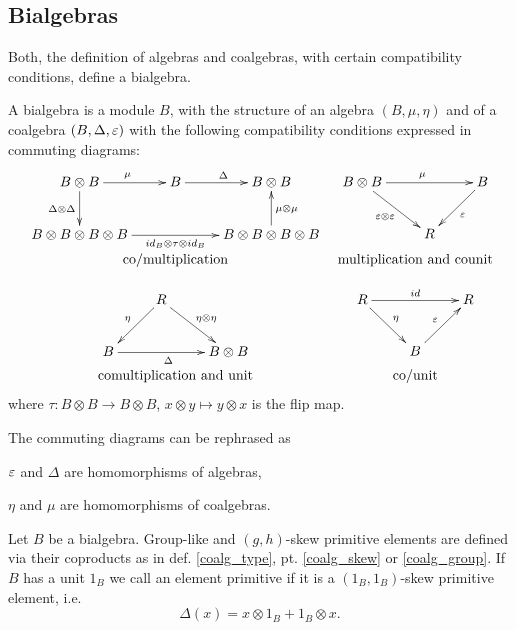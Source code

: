 \subsection{Bialgebras}
Both, the definition of algebras and coalgebras, with certain compatibility conditions, define a bialgebra.
\begin{defi}\label{defi11}
A bialgebra is a module $B$, with the structure of an algebra $(B,\mu,\eta)$ and of a coalgebra $(B,\Delta,\varepsilon)$ with the following compatibility conditions expressed in commuting diagrams:
$$\bao{cc}
\xymatrix{
 B \otimes B \ar[r]^\mu \ar[d]_{\Delta \otimes \Delta} & B \ar[r]^\Delta & B \otimes B\\
 B \otimes B \otimes B \otimes B \ar[rr]_{id_B \otimes \tau \otimes id_B}&& B \otimes B \otimes B \otimes B \ar[u]_{\mu \otimes \mu}\\
 }
 &\xymatrix{
 B \otimes B \ar[rd]_{\eps \otimes \eps} \ar[rr]^\mu & & B\ar[ld]^\eps\\
 &R&
 }\\
 \trm{co/multiplication} & \trm{multiplication~and~counit}\\
 &\\
 \xymatrix{
 &R \ar[ld]_\eta \ar[rd]^{\eta \otimes \eta}&\\
  B \ar[rr]_\Delta&&B \otimes B \\ 
 }
 &\xymatrix{
 R \ar[rr]^{id}\ar[rd]^\eta && R \\
 &B\ar[ru]^\eps&
 }\\
 \trm{comultiplication~and~unit} & \trm{co/unit}\\
 \ea$$
 where $\tau : B \otimes B \rightarrow B \otimes B$, $x \otimes y \mapsto y\otimes x$ is the flip map.
\end{defi}
\bmk The commuting diagrams can be rephrased as
\bn
\item $\varepsilon$ and $\Delta$ are homomorphisms of algebras,
\item $\eta$ and $\mu$ are homomorphisms of coalgebras.
\en
\begin{defi}\label{defi12}
Let $B$ be a bialgebra. Group-like and $(g,h)$-skew primitive elements are defined via their coproducts as in def. \ref{coalg_type}, pt. \ref{coalg_skew} or \ref{coalg_group}. If $B$ has a unit $1_B$ we call an element primitive if it is a $(1_B,1_B)$-skew primitive element, i.e. 
$$\Delta(x) = x \otimes 1_B + 1_B \otimes x.$$
\end{defi}
